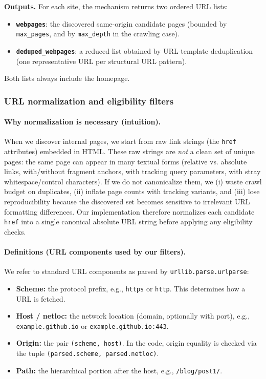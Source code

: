 \noindent\textbf{Outputs.}
For each site, the mechanism returns two ordered URL lists:
\begin{itemize}
    \item \textbf{\texttt{webpages}}: the discovered same-origin candidate pages (bounded by \texttt{max\_pages}, and by \texttt{max\_depth} in the crawling case).
    \item \textbf{\texttt{deduped\_webpages}}: a reduced list obtained by URL-template deduplication (one representative URL per structural URL pattern).
\end{itemize}
Both lists always include the homepage.

\subsubsection{URL normalization and eligibility filters}
\label{app:url-normalization}

\paragraph{Why normalization is necessary (intuition).}
When we discover internal pages, we start from raw link strings (the \texttt{href} attributes) embedded in HTML. These raw strings are \emph{not} a clean set of unique pages: the same page can appear in many textual forms (relative vs. absolute links, with/without fragment anchors, with tracking query parameters, with stray whitespace/control characters). If we do not canonicalize them, we (i) waste crawl budget on duplicates, (ii) inflate page counts with tracking variants, and (iii) lose reproducibility because the discovered set becomes sensitive to irrelevant URL formatting differences. Our implementation therefore normalizes each candidate \texttt{href} into a single canonical absolute URL string before applying any eligibility checks.

\paragraph{Definitions (URL components used by our filters).}
We refer to standard URL components as parsed by \texttt{urllib.parse.urlparse}:
\begin{itemize}
    \item \textbf{Scheme:} the protocol prefix, e.g., \texttt{https} or \texttt{http}. This determines how a URL is fetched.
    \item \textbf{Host / netloc:} the network location (domain, optionally with port), e.g., \texttt{example.github.io} or \texttt{example.github.io:443}.
    \item \textbf{Origin:} the pair \texttt{(scheme, host)}. In the code, origin equality is checked via the tuple \texttt{(parsed.scheme, parsed.netloc)}.
    \item \textbf{Path:} the hierarchical portion after the host, e.g., \texttt{/blog/post1/}.
\end{itemize}

